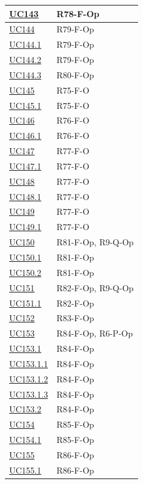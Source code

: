 \begin{longtable}{|p{2.8cm}|p{10.2cm}|}
	\hyperlink{uc143}{UC143}     & R78-F-Op \\ \hline
	\hyperlink{uc144}{UC144}     & R79-F-Op \\ \hline
	\hyperlink{uc144.1}{UC144.1} & R79-F-Op \\ \hline
	\hyperlink{uc144.2}{UC144.2} & R79-F-Op \\ \hline
	\hyperlink{uc144.3}{UC144.3} & R80-F-Op \\ \hline
	\hyperlink{uc145}{UC145}     & R75-F-O \\ \hline
	\hyperlink{uc145.1}{UC145.1} & R75-F-O \\ \hline
	\hyperlink{uc146}{UC146}     & R76-F-O \\ \hline
	\hyperlink{uc146.1}{UC146.1} & R76-F-O \\ \hline
	\hyperlink{uc147}{UC147}     & R77-F-O \\ \hline
	\hyperlink{uc147.1}{UC147.1} & R77-F-O \\ \hline
	\hyperlink{uc148}{UC148}     & R77-F-O \\ \hline
	\hyperlink{uc148.1}{UC148.1} & R77-F-O \\ \hline
	\hyperlink{uc149}{UC149}     & R77-F-O \\ \hline
	\hyperlink{uc149.1}{UC149.1} & R77-F-O \\ \hline
	\hyperlink{uc150}{UC150}     & R81-F-Op, R9-Q-Op \\ \hline
	\hyperlink{uc150.1}{UC150.1} & R81-F-Op \\ \hline
	\hyperlink{uc150.2}{UC150.2} & R81-F-Op \\ \hline
	\hyperlink{uc151}{UC151}     & R82-F-Op, R9-Q-Op \\ \hline
	\hyperlink{uc151.1}{UC151.1} & R82-F-Op \\ \hline
	\hyperlink{uc152}{UC152}     & R83-F-Op \\ \hline
	\hyperlink{uc153}{UC153}     & R84-F-Op, R6-P-Op \\ \hline
	\hyperlink{uc153.1}{UC153.1}     & R84-F-Op \\ \hline
	\hyperlink{uc153.1.1}{UC153.1.1} & R84-F-Op \\ \hline
	\hyperlink{uc153.1.2}{UC153.1.2} & R84-F-Op \\ \hline
	\hyperlink{uc153.1.3}{UC153.1.3} & R84-F-Op \\ \hline
	\hyperlink{uc153.2}{UC153.2} & R84-F-Op \\ \hline
	\hyperlink{uc154}{UC154}     & R85-F-Op \\ \hline
	\hyperlink{uc154.1}{UC154.1} & R85-F-Op \\ \hline
	\hyperlink{uc155}{UC155}     & R86-F-Op \\ \hline
	\hyperlink{uc155.1}{UC155.1} & R86-F-Op \\ \hline


\end{longtable}
